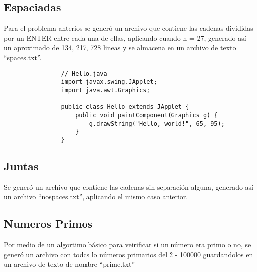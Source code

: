 \documentclass[a4paper]{article}
\begin{document}
            \subsection{Espaciadas}
            Para el problema anterios se generó un archivo que contiene las cadenas divididas por un ENTER entre cada una de ellas, aplicando cuando n = 27, generado así un aproximado de 134, 217, 728 lineas y se almacena en un archivo de texto ``spaces.txt''.
            \begin{lstlisting}
                // Hello.java
                import javax.swing.JApplet;
                import java.awt.Graphics;
                
                public class Hello extends JApplet {
                    public void paintComponent(Graphics g) {
                        g.drawString("Hello, world!", 65, 95);
                    }    
                }
            \end{lstlisting}

            \subsection{Juntas}
            Se generó un archivo que contiene las cadenas sin separación alguna, generado así un archivo ``nospaces.txt'', aplicando el mismo caso anterior.

            \subsection{Numeros Primos}
            Por medio de un algortimo básico para veirificar si un número era primo o no, se generó un archivo con todos lo números primarios del 2 - 100000 guardandolos en un archivo de texto de nombre ``prime.txt''

            
\end{document}
